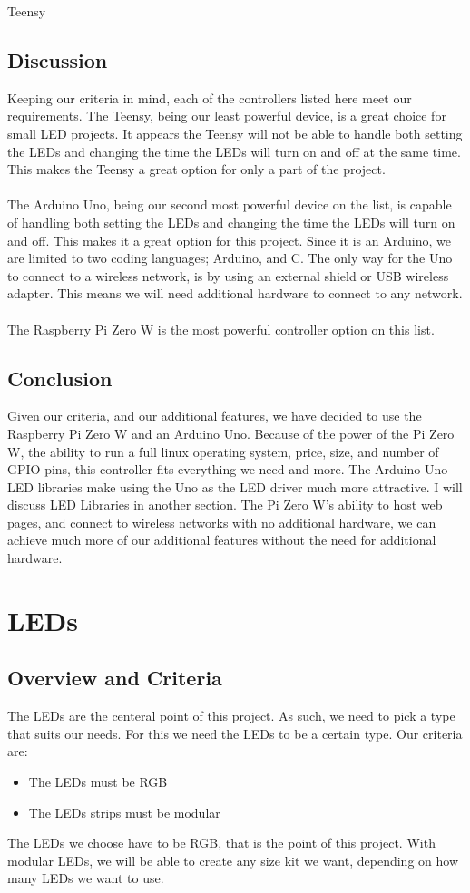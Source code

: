 Teensy\documentclass[onecolumn, draftclsnofoot,10pt, compsoc]{IEEEtran}
\begin{document}
		\subsection{Discussion}
		Keeping our criteria in mind, each of the controllers listed here meet our
		requirements. The Teensy, being our least powerful device, is a great choice
		for small LED projects. It appears the Teensy will not be able to handle
		both setting the LEDs and changing the time the LEDs will turn on and off
		at the same time. This makes the Teensy a great option for only a part of
		the project.
		\\\\
		The Arduino Uno, being our second most powerful device on the list, is
		capable of handling both setting the LEDs and changing the time the LEDs
		will turn on and off. This makes it a great option for this project. Since
		it is an Arduino, we are limited to two coding languages; Arduino, and C.
		The only way for the Uno to connect to a wireless network, is by using an
		external shield or USB wireless adapter. This means we will need additional
		hardware to connect to any network.
		\\\\
		The Raspberry Pi Zero W is the most powerful controller option on this
		list.
		\subsection{Conclusion}
		Given our criteria, and our additional features, we have decided to use the
		Raspberry Pi Zero W and an Arduino Uno. Because of the power of the Pi Zero
		W, the ability to run a full linux operating system, price, size, and number
		of GPIO pins, this controller fits everything we need and more. The Arduino
		Uno LED libraries make using the Uno as the LED driver much more attractive.
		I will discuss LED Libraries in another section. The Pi Zero W's ability to
		host web pages, and connect to wireless networks with no additional
		hardware, we can achieve much more of our additional features without the
		need for additional hardware.
	\section{LEDs}
		\subsection{Overview and Criteria}
		The LEDs are the centeral point of this project. As such, we need to pick
		a type that suits our needs. For this we need the LEDs to be a certain
		type. Our criteria are:
		\begin{itemize}
			\item The LEDs must be RGB
			\item The LEDs strips must be modular
		\end{itemize}
		The LEDs we choose have to be RGB, that is the point of this project.
 		With modular LEDs, we will be able to create any size kit we want,
		depending on how many LEDs we want to use.
\end{document}
